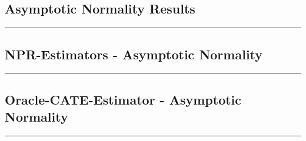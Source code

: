 \subsection{Asymptotic Normality Results}
\hrule


\subsection{NPR-Estimators - Asymptotic Normality}
\hrule

\newpage
\subsection{Oracle-CATE-Estimator - Asymptotic Normality}
\hrule

\newpage
